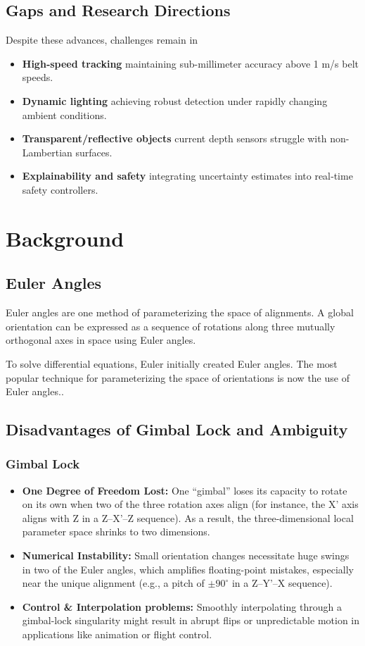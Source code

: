 \documentclass[12pt]{article}
\begin{document}
\subsection{Gaps and Research Directions}
Despite these advances, challenges remain in  
\begin{itemize}[nosep]
  \item \textbf{High‐speed tracking} maintaining sub-millimeter accuracy above 1 m/s belt speeds.
  \item \textbf{Dynamic lighting} achieving robust detection under rapidly changing ambient conditions.
  \item \textbf{Transparent/reflective objects} current depth sensors struggle with non-Lambertian surfaces.
  \item \textbf{Explainability and safety} integrating uncertainty estimates into real‐time safety controllers.
\end{itemize}


\newpage
\section{Background}
\subsection{Euler Angles}
Euler angles are one method of parameterizing the space of alignments.  A global orientation can be expressed as a sequence of rotations along three mutually orthogonal axes in space using Euler angles.

To solve differential equations, Euler initially created Euler angles. The most popular technique for parameterizing the space of orientations is now the use of Euler angles.\cite{ref20}.

\subsection{Disadvantages of Gimbal Lock and Ambiguity}
\subsubsection{Gimbal Lock}
\begin{itemize}
  \item \textbf{One Degree of Freedom Lost:} 
   One ``gimbal'' loses its capacity to rotate on its own when two of the three rotation axes align (for instance, the X' axis aligns with Z in a Z–X'–Z sequence).  As a result, the three-dimensional local parameter space shrinks to two dimensions\cite{ref20}.
  \item \textbf{Numerical Instability:} 
    Small orientation changes necessitate huge swings in two of the Euler angles, which amplifies floating-point mistakes, especially near the unique alignment (e.g., a pitch of $\pm90^\circ$ in a Z–Y'–X sequence)\cite{ref20}.
  \item \textbf{Control \& Interpolation problems:} 
    Smoothly interpolating through a gimbal-lock singularity might result in abrupt flips or unpredictable motion in applications like animation or flight control\cite{ref20}.
\end{itemize}
\end{document}

